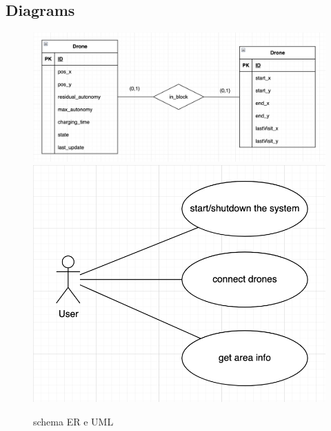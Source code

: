 \documentclass[a4paper, 11pt]{article}
\begin{document}
\subsection{Diagrams}
\begin{figure}[htbp]
    \centering
    \includegraphics[height = 4 cm]{image/ER1.png}%
    \qquad\qquad
    \includegraphics[height = 4 cm]{image/UML1.png}
    \caption{schema ER e UML}
\end{figure}
\end{document}
